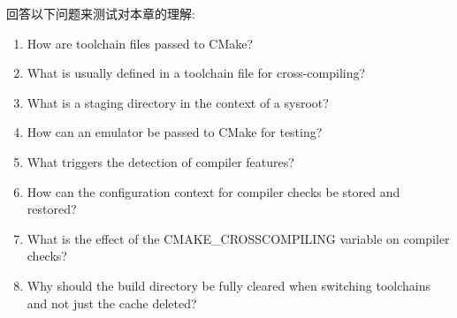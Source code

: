 回答以下问题来测试对本章的理解:

\begin{enumerate}
\item 
How are toolchain files passed to CMake?

\item 
What is usually defined in a toolchain file for cross-compiling?

\item 
What is a staging directory in the context of a sysroot?

\item 
How can an emulator be passed to CMake for testing?

\item 
What triggers the detection of compiler features?

\item 
How can the configuration context for compiler checks be stored and restored?

\item 
What is the effect of the CMAKE\_CROSSCOMPILING variable on compiler checks?

\item 
Why should the build directory be fully cleared when switching toolchains and not just the cache deleted?
\end{enumerate}